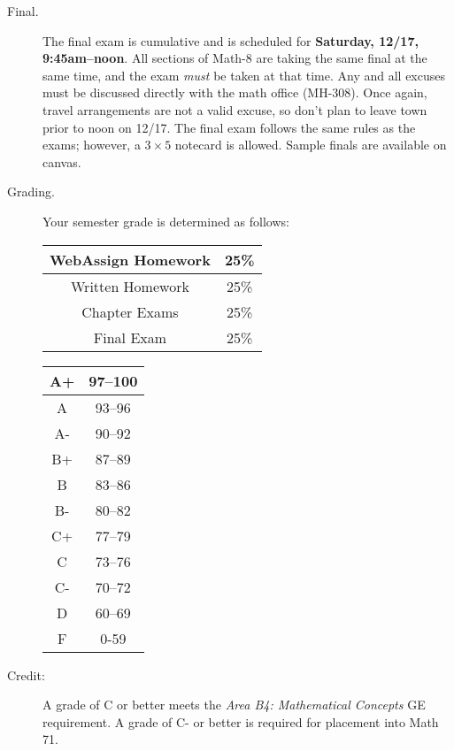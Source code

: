 \documentclass[letterpaper,12pt,fleqn]{article}
\begin{document}
\begin{description}
\item[Final.] The final exam is cumulative and is scheduled for
  \textbf{Saturday, 12/17, 9:45am--noon}.  All sections of Math-8 are taking the
  same final at the same time, and the exam \emph{must} be taken at that time.
  Any and all excuses must be discussed directly with the math office (MH-308).
  Once again, travel arrangements are not a valid excuse, so don't plan to leave
  town prior to noon on 12/17.  The final exam follows the same rules as the
  exams; however, a $3\times 5$ notecard is allowed.  Sample finals are
  available on canvas.

\item[Grading.]  Your semester grade is determined as follows:

  \bigskip

  \begin{minipage}{3in}
    \begin{tabular}{|c|c|}
      \hline
      WebAssign Homework & 25\% \\
      \hline
      Written Homework & 25\% \\
      \hline
      Chapter Exams & 25\% \\
      \hline
      Final Exam & 25\% \\
      \hline
    \end{tabular}
  \end{minipage}
  \begin{minipage}{3in}
    \begin{tabular}{|c|c|}
      \hline
      A+ & 97--100 \\
      \hline
      A & 93--96 \\
      \hline
      A- & 90--92 \\
      \hline
      B+ & 87--89 \\
      \hline
      B & 83--86 \\
      \hline
      B- & 80--82 \\
      \hline
      C+ & 77--79 \\
      \hline
      C & 73--76 \\
      \hline
      C- & 70--72 \\
      \hline
      D & 60--69 \\
      \hline
      F & 0-59 \\
      \hline
    \end{tabular}
  \end{minipage}
  
\item[Credit:] A grade of C or better meets the \emph{Area B4: Mathematical
    Concepts} GE requirement. A grade of C- or better is required for placement
    into Math 71.


\end{description}
\end{document}
